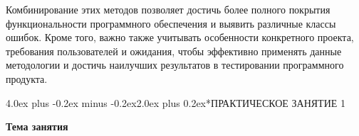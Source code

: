 \documentclass[12pt, a4paper]{book}%
\makeatletter
\renewcommand{\section}{\@startsection{section}{1}{1pt}%
{4.0ex plus -0.2ex minus -0.2ex}{2.0ex plus 0.2ex}{\centering\bf}}%
\makeatother
\begin{document}
{\begin{itemize}
\end{itemize}

Комбинирование этих методов позволяет достичь более полного покрытия функциональности программного обеспечения и выявить различные классы ошибок. Кроме того, важно также учитывать особенности конкретного проекта, требования пользователей и ожидания, чтобы эффективно применять данные методологии и достичь наилучших результатов в тестировании программного продукта.





\newpage%
\section*{ПРАКТИЧЕСКОЕ ЗАНЯТИЕ 1}%
 \vspace{-10pt}%
\begin{center}%
 {\bf%
 Тема занятия}
\end{center}%

}
\end{document}
